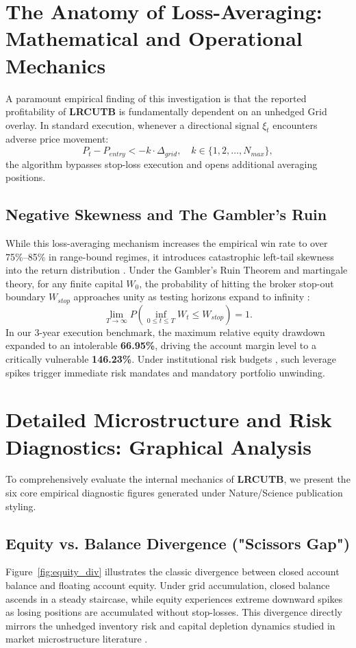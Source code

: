 \documentclass[11pt,a4paper]{article}
\begin{document}
\section{The Anatomy of Loss-Averaging: Mathematical and Operational Mechanics}
A paramount empirical finding of this investigation is that the reported profitability of \textbf{LRCUTB} is fundamentally dependent on an unhedged Grid overlay. In standard execution, whenever a directional signal $\xi_t$ encounters adverse price movement:
\begin{equation}
P_t - P_{entry} < -k \cdot \Delta_{grid}, \quad k \in \{1, 2, \dots, N_{max}\},
\end{equation}
the algorithm bypasses stop-loss execution and opens additional averaging positions. 

\subsection{Negative Skewness and The Gambler's Ruin}
While this loss-averaging mechanism increases the empirical win rate to over 75\%--85\% in range-bound regimes, it introduces catastrophic left-tail skewness into the return distribution \cite{bouchaud2003theory, cont2001empirical}. Under the Gambler's Ruin Theorem and martingale theory, for any finite capital $W_0$, the probability of hitting the broker stop-out boundary $W_{stop}$ approaches unity as testing horizons expand to infinity \cite{bouchaud2009markets}:
\begin{equation}
\lim_{T \to \infty} P\left(\inf_{0 \le t \le T} W_t \le W_{stop}\right) = 1.
\end{equation}
In our 3-year execution benchmark, the maximum relative equity drawdown expanded to an intolerable \textbf{66.95\%}, driving the account margin level to a critically vulnerable \textbf{146.23\%}. Under institutional risk budgets \cite{rockafellar2000optimization, shleifer1997limits}, such leverage spikes trigger immediate risk mandates and mandatory portfolio unwinding.


\section{Detailed Microstructure and Risk Diagnostics: Graphical Analysis}
To comprehensively evaluate the internal mechanics of \textbf{LRCUTB}, we present the six core empirical diagnostic figures generated under Nature/Science publication styling.

\subsection{Equity vs. Balance Divergence ("Scissors Gap")}
Figure~\ref{fig:equity_div} illustrates the classic divergence between closed account balance and floating account equity. Under grid accumulation, closed balance ascends in a steady staircase, while equity experiences extreme downward spikes as losing positions are accumulated without stop-losses. This divergence directly mirrors the unhedged inventory risk and capital depletion dynamics studied in market microstructure literature \cite{shleifer1997limits, bouchaud2009markets}.
\end{document}
